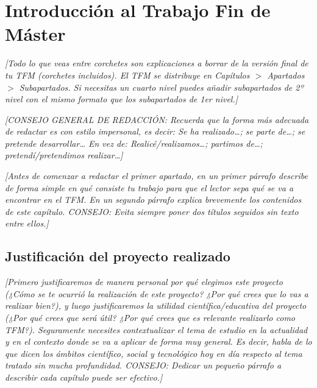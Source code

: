
\chapter{Introducción al Trabajo Fin de Máster}

\label{Chapter1}


\textit{[Todo lo que veas entre corchetes son explicaciones a borrar de la versión final de tu TFM (corchetes incluidos). El TFM se distribuye en Capítulos $>$ Apartados $>$ Subapartados. Si necesitas un cuarto nivel puedes añadir subapartados de 2º nivel con el mismo formato que los subapartados de 1er nivel.]}

\textit{[CONSEJO GENERAL DE REDACCIÓN: Recuerda que la forma más adecuada de redactar es con estilo impersonal, es decir: \emph{Se ha realizado\ldots; se parte de\ldots; se pretende desarrollar\ldots} En vez de: \emph{Realicé/realizamos\ldots; partimos de\ldots; pretendí/pretendimos realizar\ldots}]}

\textit{[Antes de comenzar a redactar el primer apartado, en un primer párrafo describe de forma simple en qué consiste tu trabajo para que el lector sepa qué se va a encontrar en el TFM. En un segundo párrafo explica brevemente los contenidos de este capítulo. CONSEJO: Evita siempre poner dos títulos seguidos sin texto entre ellos.]}


\section{Justificación del proyecto realizado}

\textit{[Primero justificaremos de manera personal por qué elegimos este proyecto (¿Cómo se te ocurrió la realización de este proyecto? ¿Por qué crees que lo vas a realizar bien?), y luego justificaremos la utilidad científica/educativa del proyecto (¿Por qué crees que será útil? ¿Por qué crees que es relevante realizarlo como TFM?). Seguramente necesites contextualizar el tema de estudio en la actualidad y en el contexto donde se va a aplicar de forma muy general. Es decir, habla de lo que dicen los ámbitos científico, social y tecnológico hoy en día respecto al tema tratado sin mucha profundidad. CONSEJO: Dedicar un pequeño párrafo a describir cada capítulo puede ser efectivo.]}

